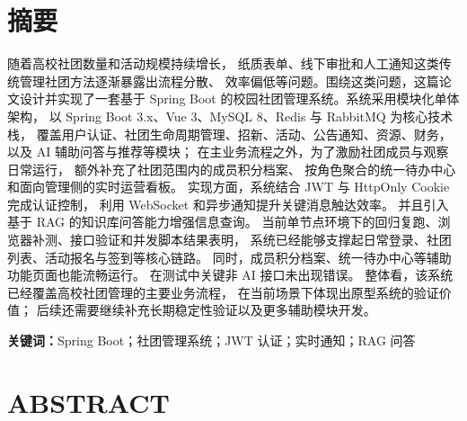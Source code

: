 ﻿%
\chapter*{摘\quad 要}

随着高校社团数量和活动规模持续增长，
纸质表单、线下审批和人工通知这类传统管理社团方法逐渐暴露出流程分散、
效率偏低等问题。围绕这类问题，这篇论文设计并实现了一套基于 Spring Boot 
的校园社团管理系统。系统采用模块化单体架构，
以 Spring Boot 3.x、Vue 3、MySQL 8、Redis 与 RabbitMQ 为核心技术栈，
覆盖用户认证、社团生命周期管理、招新、活动、公告通知、资源、财务，以及 AI 辅助问答与推荐等模块；
在主业务流程之外，为了激励社团成员与观察日常运行，
额外补充了社团范围内的成员积分档案、
按角色聚合的统一待办中心和面向管理侧的实时运营看板。
实现方面，系统结合 JWT 与 HttpOnly Cookie 完成认证控制，
利用 WebSocket 和异步通知提升关键消息触达效率。
并且引入基于 RAG 的知识库问答能力增强信息查询。
当前单节点环境下的回归复跑、浏览器补测、接口验证和并发脚本结果表明，
系统已经能够支撑起日常登录、社团列表、活动报名与签到等核心链路。
同时，成员积分档案、统一待办中心等辅助功能页面也能流畅运行。
在测试中关键非 AI 接口未出现错误。
整体看，该系统已经覆盖高校社团管理的主要业务流程，
在当前场景下体现出原型系统的验证价值；
后续还需要继续补充长期稳定性验证以及更多辅助模块开发。

\vspace{1em}
\noindent\textbf{关键词：}Spring Boot；社团管理系统；JWT 认证；实时通知；RAG 问答

\newpage

\chapter*{ABSTRACT}

